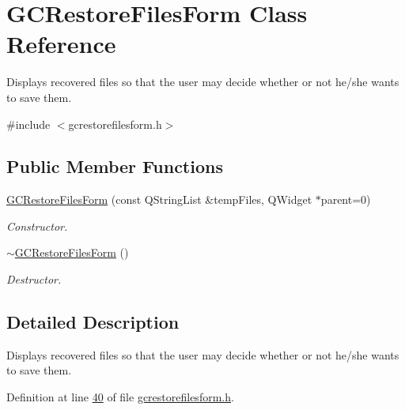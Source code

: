 \hypertarget{class_g_c_restore_files_form}{\section{\-G\-C\-Restore\-Files\-Form \-Class \-Reference}
\label{class_g_c_restore_files_form}
}


\-Displays recovered files so that the user may decide whether or not he/she wants to save them.  




{\ttfamily \#include $<$gcrestorefilesform.\-h$>$}

\subsection*{\-Public \-Member \-Functions}
\begin{DoxyCompactItemize}
\item 
\hyperlink{class_g_c_restore_files_form_a0b736b8d4da5adb072e32ea188526634}{\-G\-C\-Restore\-Files\-Form} (const \-Q\-String\-List \&temp\-Files, \-Q\-Widget $\ast$parent=0)
\begin{DoxyCompactList}\small\item\em \-Constructor. \end{DoxyCompactList}\item 
\hyperlink{class_g_c_restore_files_form_a69ec217c50d53d5cb0cfbf7b7da56936}{$\sim$\-G\-C\-Restore\-Files\-Form} ()
\begin{DoxyCompactList}\small\item\em \-Destructor. \end{DoxyCompactList}\end{DoxyCompactItemize}


\subsection{\-Detailed \-Description}
\-Displays recovered files so that the user may decide whether or not he/she wants to save them. 

\-Definition at line \hyperlink{gcrestorefilesform_8h_source_l00040}{40} of file \hyperlink{gcrestorefilesform_8h_source}{gcrestorefilesform.\-h}.



